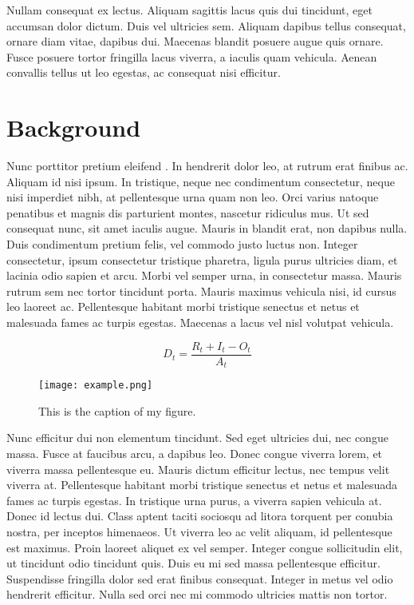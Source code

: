 \documentclass[11pt,letterpaper]{article} %
\begin{document}
Nullam consequat ex lectus. Aliquam sagittis lacus quis dui tincidunt, eget accumsan dolor dictum. Duis vel ultricies sem. Aliquam dapibus tellus consequat, ornare diam vitae, dapibus dui. Maecenas blandit posuere augue quis ornare. Fusce posuere tortor fringilla lacus viverra, a iaculis quam vehicula. Aenean convallis tellus ut leo egestas, ac consequat nisi efficitur.

\section{Background}

Nunc porttitor pretium eleifend \citep{boarnet_travel_2001}. In hendrerit dolor leo, at rutrum erat finibus ac. Aliquam id nisi ipsum. In tristique, neque nec condimentum consectetur, neque nisi imperdiet nibh, at pellentesque urna quam non leo. Orci varius natoque penatibus et magnis dis parturient montes, nascetur ridiculus mus. Ut sed consequat nunc, sit amet iaculis augue. Mauris in blandit erat, non dapibus nulla. Duis condimentum pretium felis, vel commodo justo luctus non. Integer consectetur, ipsum consectetur tristique pharetra, ligula purus ultricies diam, et lacinia odio sapien et arcu. Morbi vel semper urna, in consectetur massa. Mauris rutrum sem nec tortor tincidunt porta. Mauris maximus vehicula nisi, id cursus leo laoreet ac. Pellentesque habitant morbi tristique senectus et netus et malesuada fames ac turpis egestas. Maecenas a lacus vel nisl volutpat vehicula.

\begin{equation}
	\label{eq:my_equation}
	D_t = \frac{R_t + I_t - O_t}{A_t}
\end{equation}

\begin{figure*}[htbp]
	\centering
	\texttt{[image: example.png]}
	\caption{This is the caption of my figure.}
	\label{fig:my_figure}
\end{figure*}

Nunc efficitur dui non elementum tincidunt. Sed eget ultricies dui, nec congue massa. Fusce at faucibus arcu, a dapibus leo. Donec congue viverra lorem, et viverra massa pellentesque eu. Mauris dictum efficitur lectus, nec tempus velit viverra at. Pellentesque habitant morbi tristique senectus et netus et malesuada fames ac turpis egestas. In tristique urna purus, a viverra sapien vehicula at. Donec id lectus dui. Class aptent taciti sociosqu ad litora torquent per conubia nostra, per inceptos himenaeos. Ut viverra leo ac velit aliquam, id pellentesque est maximus. Proin laoreet aliquet ex vel semper. Integer congue sollicitudin elit, ut tincidunt odio tincidunt quis. Duis eu mi sed massa pellentesque efficitur. Suspendisse fringilla dolor sed erat finibus consequat. Integer in metus vel odio hendrerit efficitur. Nulla sed orci nec mi commodo ultricies mattis non tortor.
\end{document}
